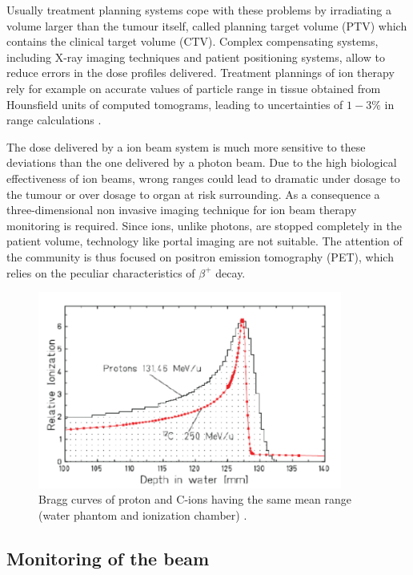 Usually treatment planning systems cope with these problems by irradiating a volume larger than the tumour itself, called planning target volume (PTV) which contains the clinical target volume (CTV). Complex compensating systems, including X-ray imaging techniques and patient positioning systems, allow to reduce errors in the dose profiles delivered. 
Treatment plannings of ion therapy rely for example on accurate values of particle range in tissue obtained from Hounsfield units of computed tomograms, leading to uncertainties of $1-3\%$ in range calculations \cite{Enghardt2004}.

The dose delivered by a ion beam system is much more sensitive to these deviations than the one delivered by a photon beam. Due to the high biological effectiveness of ion beams, wrong ranges could lead to dramatic under dosage to the tumour or over dosage to organ at risk surrounding.
As a consequence a three-dimensional non invasive imaging technique for ion beam therapy monitoring is required. Since ions, unlike photons, are stopped completely in the patient volume, technology like portal imaging are not suitable. The attention of the community is thus focused on positron emission tomography (PET), which relies on the peculiar characteristics of $\beta ^{+}$ decay.

\begin{figure} 
\centering 
\includegraphics[width=10cm]{Pictures/Chapter_1/range_scatter.pdf}
\caption[Peak spread for Carbon]{Bragg curves of proton and C-ions having the same mean range (water phantom and ionization chamber) \cite{Schardt2007}.}
\label{fig:spread}
\end{figure}

\subsection{Monitoring of the beam}

